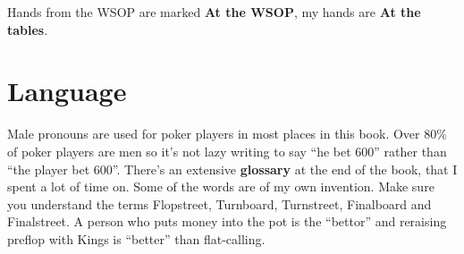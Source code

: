 Hands from the WSOP are marked \textbf{At the WSOP}, my hands are
\textbf{At the tables}.


\section*{Language}

Male pronouns are used for poker players in most places in this
book. Over 80\% of poker players are men so it's not lazy writing
to say ``he bet 600'' rather than ``the player bet 600''. There's an
extensive \textbf{glossary} at the end of the book, that I spent a lot
of time on. Some of the words are of my own invention. Make sure you
understand the terms Flopstreet, Turnboard, Turnstreet, Finalboard and
Finalstreet. A person who puts money into the pot is the ``bettor''
and reraising preflop with Kings is ``better'' than flat-calling.
